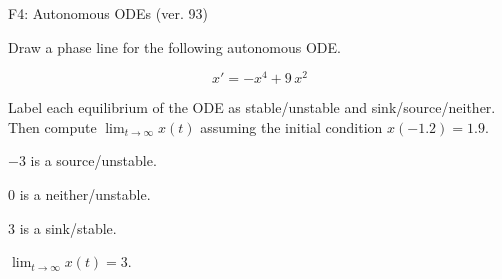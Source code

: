 \begin{exercise}
  \begin{exerciseTitle}F4: Autonomous ODEs (ver. 93)\end{exerciseTitle}
  \begin{exerciseStatement}
    

      Draw a phase line for the following 
      autonomous ODE.
    

    
\[x'= -x^{4} + 9 \, x^{2}\]

    

      Label each equilibrium of the ODE
      as stable/unstable and sink/source/neither.
      Then compute \(\lim_{t\to\infty}x(t)\)
      assuming the initial condition
      \(x( -1.2 )= 1.9\).
    

  \end{exerciseStatement}
  \begin{exerciseAnswer}
    

      \(-3\) is a source/unstable.
      
        \(0\) is a neither/unstable.
      
      \(3\) is a sink/stable.
    

    

      \(\lim_{t\to\infty}x(t)=3\).
    

  \end{exerciseAnswer}
\end{exercise}